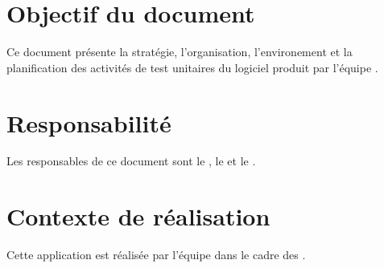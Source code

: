 \section*{Objectif du document}
	Ce document présente la stratégie, l'organisation, l'environement et la planification des activités de test unitaires du logiciel produit par l'équipe \nomEquipe{}.
	
\section*{Responsabilité}
	Les responsables de ce document sont le \CP, le \RQ{} et le \RD.
	
\section*{Contexte de réalisation}
	Cette application est réalisée par l'équipe \nomEquipe{} dans le cadre des \PIC.

